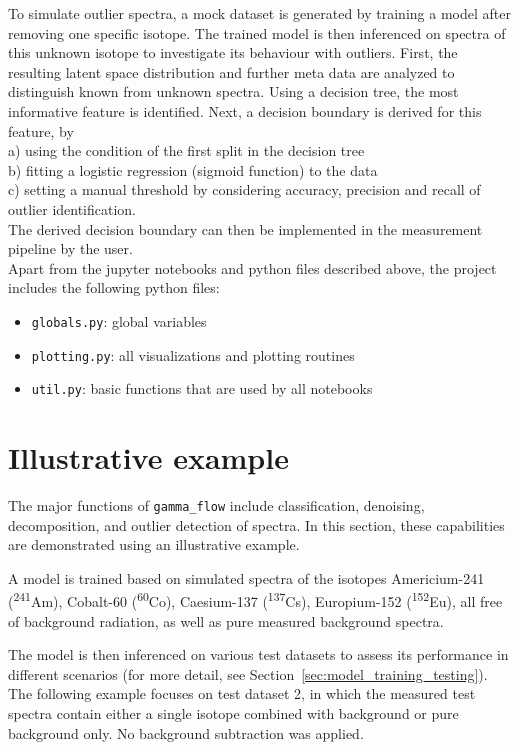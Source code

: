 \documentclass[review, 12pt, a4paper]{elsarticle}
\begin{document}
To simulate outlier spectra, a mock dataset is generated by training a model after removing one specific isotope. The trained model is then inferenced on spectra of this unknown isotope to investigate its behaviour with outliers. 
First, the resulting latent space distribution and further meta data are analyzed to distinguish known from unknown spectra. Using a decision tree, the most informative feature is identified. 
Next, a decision boundary is derived for this feature, by  \\
a) using the condition of the first split in the decision tree \\
b) fitting a logistic regression (sigmoid function) to the data \\ 
c) setting a manual threshold by considering accuracy, precision and recall of outlier identification. \\
The derived decision boundary can then be implemented in the measurement pipeline by the user. \\


Apart from the jupyter notebooks and python files described above, the project includes the following python files:  
\begin{itemize}
\item \texttt{globals.py}: global variables  
\item \texttt{plotting.py}: all visualizations and plotting routines    
\item \texttt{util.py}: basic functions that are used by all notebooks  
\end{itemize}


\section{Illustrative example}

The major functions of \texttt{gamma\_flow} include classification, denoising, decomposition, and outlier detection of spectra. In this section, these capabilities are demonstrated using an illustrative example. 

A model is trained based on simulated spectra of the isotopes Americium-241 (\textsuperscript{241}Am), Cobalt-60 (\textsuperscript{60}Co), Caesium-137 (\textsuperscript{137}Cs), Europium-152 (\textsuperscript{152}Eu), all free of background radiation, as well as pure measured background spectra. 

The model is then inferenced on various test datasets to assess its performance in different scenarios (for more detail, see Section~\ref{sec:model_training_testing}). The following example focuses on test dataset 2, in which the measured test spectra contain either a single isotope combined with background or pure background only. No background subtraction was applied.
\end{document}
